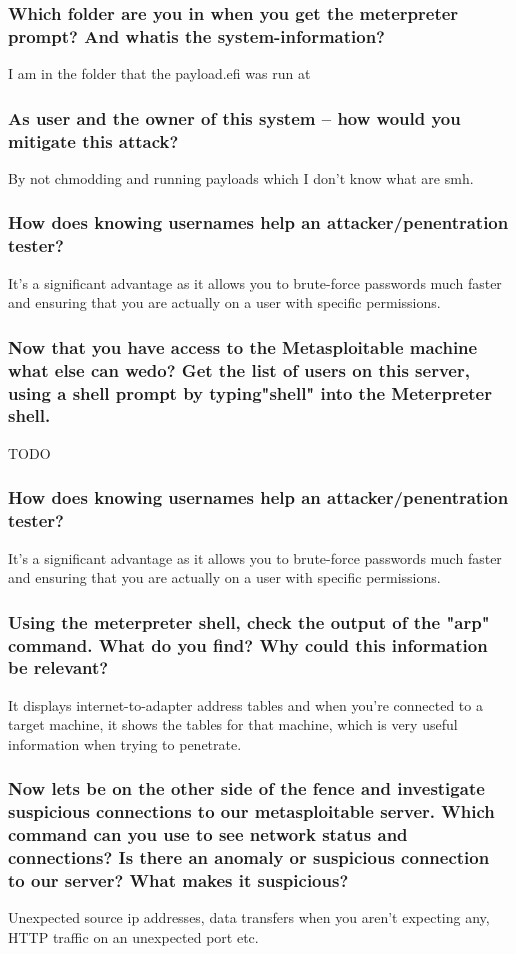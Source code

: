 \subsubsection*{Which folder are you in when you get the meterpreter prompt? And whatis the system-information?}
I am in the folder that the payload.efi was run at

\subsubsection*{As user and the owner of this system -- how would you mitigate this attack?}
By not chmodding and running payloads which I don't know what are smh.

\subsubsection*{How does knowing usernames help an attacker/penentration tester?
}
It's a significant advantage as it allows you to brute-force passwords much faster and ensuring that you are actually on a user with specific permissions.

\subsubsection*{Now that you have access to the Metasploitable machine what else can wedo? Get the list of users on this server, using a shell prompt by typing"shell" into the Meterpreter shell.}
TODO

\subsubsection*{How does knowing usernames help an attacker/penentration tester?}
It's a significant advantage as it allows you to brute-force passwords much faster and ensuring that you are actually on a user with specific permissions.

\subsubsection*{Using the meterpreter shell, check the output of the "arp" command. What do you find? Why could this information be relevant?
}
It displays internet-to-adapter address tables and when you're connected to a target machine, it shows the tables for that machine, which is very useful information when trying to penetrate.

\subsubsection*{Now lets be on the other side of the fence and investigate suspicious connections to our metasploitable server. Which command can you use to see network status and connections? Is there an anomaly or suspicious connection to our server? What makes it suspicious?}
Unexpected source ip addresses, data transfers when you aren't expecting any, HTTP traffic on an unexpected port etc.